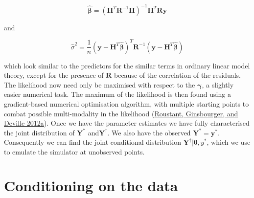 \documentclass[
  12pt,
  a4paper,
  twoside]{book}
\begin{document}
\begin{equation}
\label{eq:beta-hat}
\mathbf{\hat{\beta}} = \left( \mathbf{H}^T\mathbf{R}^{-1}\mathbf{H} \right)^{-1}\mathbf{H}^T \mathbf{R}\mathbf{y}
\end{equation}

and

\begin{equation}
\label{eq:sigma-hat}
\hat{\sigma}^2 = \frac{1}{n} \left( \mathbf{y} - \mathbf{H}^T\mathbf{\hat{\beta}}\right)^T \mathbf{R} ^{-1}\left( \mathbf{y} - \mathbf{H}^T\mathbf{\hat{\beta}}\right)
\end{equation}

which look similar to the predictors for the similar terms in ordinary linear model theory, except for the presence of \(\mathbf{R}\) because of the correlation of the residuals. The likelihood now need only be maximised with respect to the \(\mathbf{\gamma}\), a slightly easier numerical task. The maximum of the likelihood is then found using a gradient-based numerical optimisation algorithm, with multiple starting points to combat possible multi-modality in the likelihood (\protect\hyperlink{ref-dicekriging}{Roustant, Ginsbourger, and Deville 2012a}). Once we have the parameter estimates we have fully characterised the joint distribution of \(\mathbf{Y^*}\) and\(\mathbf{Y^\dagger}\). We also have the observed \(\mathbf{Y^*} = \mathbf{y^*}\). Consequently we can find the joint conditional distribution \(\mathbf{Y^\dagger}| \mathbf{\theta}, y^*\), which we use to emulate the simulator at unobserved points.

\hypertarget{conditioning-on-the-data}{%
\section{Conditioning on the data}\label{conditioning-on-the-data}}
\end{document}
